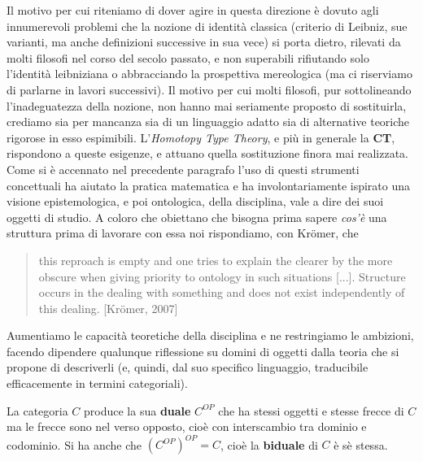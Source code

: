 \documentclass[a4paper, 11pt]{article}
\begin{document}
Il motivo per cui riteniamo di dover agire in questa direzione è dovuto agli innumerevoli problemi che la nozione di identità classica (criterio di Leibniz, sue varianti, ma anche definizioni successive in sua vece) si porta dietro, rilevati da molti filosofi nel corso del secolo passato, e non superabili rifiutando solo l'identità leibniziana o abbracciando la prospettiva mereologica (ma ci riserviamo di parlarne in lavori successivi). Il motivo per cui molti filosofi, pur sottolineando l'inadeguatezza della nozione, non hanno mai seriamente proposto di sostituirla, crediamo sia per mancanza sia di un linguaggio adatto sia di alternative teoriche rigorose in esso espimibili.
L'\textit{Homotopy Type Theory}, e più in generale la \textbf{CT}, rispondono a queste esigenze, e attuano quella sostituzione finora mai realizzata.
Come si è accennato nel precedente paragrafo l'uso di questi strumenti concettuali ha aiutato la pratica matematica e ha involontariamente ispirato una visione epistemologica, e poi ontologica, della disciplina, vale a dire dei suoi oggetti di studio. A coloro che obiettano che bisogna prima sapere \textit{cos'è} una struttura prima di lavorare con essa noi rispondiamo, con Kr\"omer, che
\begin{quotation}
	this reproach is empty and one tries to explain the clearer by the more obscure when giving priority to ontology in such situations [...]. Structure occurs in the dealing with something and does
	not exist independently of this dealing. [Kr\"omer, 2007]
\end{quotation}
Aumentiamo le capacità teoretiche della disciplina e ne restringiamo le ambizioni, facendo dipendere qualunque riflessione su domini di oggetti dalla teoria che si propone di descriverli (e, quindi, dal suo specifico linguaggio, traducibile efficacemente in termini categoriali).

La categoria $C$ produce la sua \textbf{duale} $C^{OP}$ che ha stessi oggetti e stesse frecce di $C$ ma le frecce sono nel verso opposto, cioè con interscambio tra dominio e codominio. Si ha anche che $(C^{OP})^{OP} = C$, cioè la \textbf{biduale} di $C$ è sè stessa.
\end{document}
